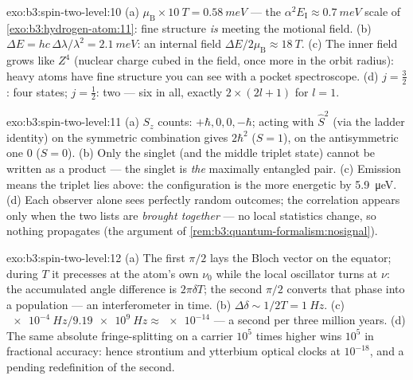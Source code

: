 \begin{solution}{exo:b3:spin-two-level:10}
(a) $\mu_{\text{B}} \times \qty{10}{T} = \qty{0.58}{meV}$ --- the
$\alpha^2E_{\text{I}} \approx \qty{0.7}{meV}$ scale of
\cref{exo:b3:hydrogen-atom:11}: fine structure \emph{is} 
meeting the motional field. (b) $\Delta E = hc\,\Delta\lambda/
\lambda^2 = \qty{2.1}{meV}$: an internal field $\Delta E/2\mu_{
\text{B}} \approx \qty{18}{T}$. (c) The inner field grows like
$Z^4$ (nuclear charge cubed in the field, once more in the orbit
radius): heavy atoms have fine structure you can see with a pocket
spectroscope. (d) $j = \tfrac32$: four states; $j = \tfrac12$: two
--- six in all, exactly $2 \times (2l + 1)$ for $l = 1$.
\end{solution}

\begin{solution}{exo:b3:spin-two-level:11}
(a) $S_z$ counts: $+\hbar, 0, 0, -\hbar$; acting with $\hat S^2$
(via the ladder identity) on the symmetric combination gives
$2\hbar^2$ ($S = 1$), on the antisymmetric one $0$ ($S = 0$). (b)
Only the singlet (and the middle triplet state) cannot be written
as a product --- the singlet is \emph{the} maximally entangled
pair. (c) Emission means the triplet lies above: the 
configuration is the more energetic by \qty{5.9}{\micro eV}. (d)
Each observer alone sees perfectly random outcomes; the
correlation appears only when the two lists are \emph{brought
together} --- no local statistics change, so nothing propagates
(the argument of \cref{rem:b3:quantum-formalism:nosignal}).
\end{solution}

\begin{solution}{exo:b3:spin-two-level:12}
(a) The first $\pi/2$ lays the Bloch vector on the equator; during
$T$ it precesses at the atom's own $\nu_0$ while the local
oscillator turns at $\nu$: the accumulated angle difference is
$2\pi\delta T$; the second $\pi/2$ converts that phase into a
population --- an interferometer in time. (b) $\Delta\delta \sim
1/2T = \qty{1}{Hz}$. (c) $\qty{e-4}{Hz}/\qty{9.19e9}{Hz} \approx
\num{e-14}$ --- a second per three million years. (d) The same
absolute fringe-splitting on a carrier $10^5$ times higher wins
$10^5$ in fractional accuracy: hence strontium and ytterbium
optical clocks at $10^{-18}$, and a pending redefinition of the
second.
\end{solution}

